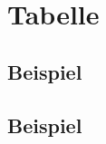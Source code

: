 \documentclass{scrreprt}
\begin{document}
\tableofcontents
\listoftables
\chapter{Tabelle}
\section{Beispiel}
\section{Beispiel}

\end{document}
